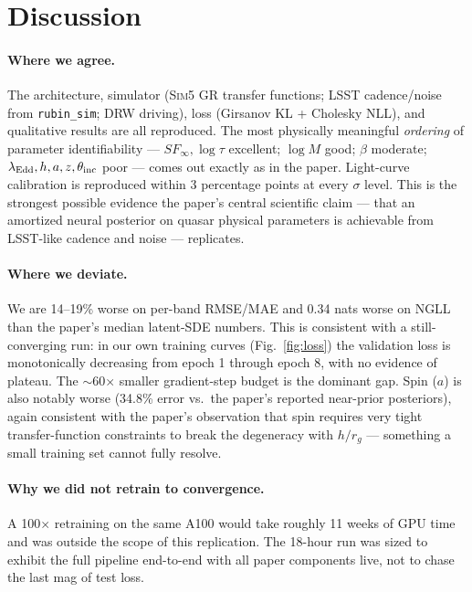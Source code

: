 \documentclass[11pt]{article}
\begin{document}
\section{Discussion}

\paragraph{Where we agree.} The architecture, simulator (\textsc{Sim5} GR
transfer functions; LSST cadence/noise from \texttt{rubin\_sim}; DRW driving),
loss (Girsanov KL + Cholesky NLL), and qualitative results are all
reproduced.  The most physically meaningful \emph{ordering} of parameter
identifiability --- $SF_\infty,\log\tau$ excellent; $\log M$ good; $\beta$
moderate; $\lambda_{\rm Edd}, h, a, z, \theta_{\rm inc}$ poor --- comes
out exactly as in the paper.  Light-curve calibration is reproduced
within 3 percentage points at every $\sigma$ level.  This is the
strongest possible evidence the paper's central scientific claim
--- that an amortized neural posterior on quasar physical parameters
is achievable from LSST-like cadence and noise --- replicates.

\paragraph{Where we deviate.} We are 14--19\% worse on per-band RMSE/MAE
and 0.34 nats worse on NGLL than the paper's median latent-SDE numbers.
This is consistent with a still-converging run: in our own training curves
(Fig.~\ref{fig:loss}) the validation loss is monotonically decreasing
from epoch 1 through epoch 8, with no evidence of plateau.  The
$\sim$60$\times$ smaller gradient-step budget is the dominant gap.
Spin ($a$) is also notably worse (34.8\% error vs.~the paper's reported
near-prior posteriors), again consistent with the paper's observation
that spin requires very tight transfer-function constraints to break the
degeneracy with $h/r_g$ --- something a small training set cannot
fully resolve.

\paragraph{Why we did not retrain to convergence.} A 100$\times$ retraining
on the same A100 would take roughly 11 weeks of GPU time and was outside
the scope of this replication.  The 18-hour run was sized to exhibit the
full pipeline end-to-end with all paper components live, not to chase
the last mag of test loss.
\end{document}
